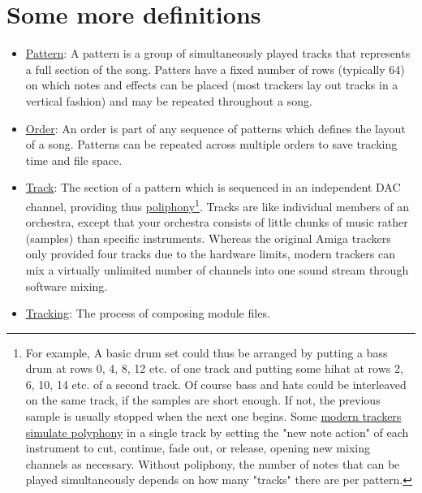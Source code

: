 \section{Some more definitions}
\begin{itemize}

\item \href{http://en.wikipedia.org/wiki/Music_tracker}{Pattern}: A
  pattern is a group of simultaneously played tracks that represents a
  full section of the song. Patters have a fixed number of rows
  (typically 64) on which notes and effects can be placed (most
  trackers lay out tracks in a vertical fashion) and may be repeated
  throughout a song.

\item \href{http://en.wikipedia.org/wiki/Music_tracker}{Order}: An
  order is part of any sequence of patterns which defines the layout of
  a song. Patterns can be repeated across multiple orders to save
  tracking time and file space.

\item
  \href{http://www.linuxplanet.com/linuxplanet/tutorials/4363/1}{Track}:
  The section of a pattern which is sequenced in an independent DAC
  channel, providing thus
  \href{http://en.wikipedia.org/wiki/Polyphony}{poliphony}\footnote{For
    example, A basic drum set could thus be arranged by putting a bass
    drum at rows 0, 4, 8, 12 etc. of one track and putting some hihat
    at rows 2, 6, 10, 14 etc. of a second track. Of course bass and
    hats could be interleaved on the same track, if the samples are
    short enough. If not, the previous sample is usually stopped when
    the next one begins. Some
    \href{http://en.wikipedia.org/wiki/Music_tracker}{modern trackers
      simulate polyphony} in a single track by setting the "new note
    action" of each instrument to cut, continue, fade out, or release,
    opening new mixing channels as necessary. Without poliphony, the
    number of notes that can be played simultaneously depends on how
    many "tracks" there are per pattern.}. Tracks are like individual
  members of an orchestra, except that your orchestra consists of
  little chunks of music rather (samples) than specific
  instruments. Whereas the original Amiga trackers only provided four
  tracks due to the hardware limits, modern trackers can mix a
  virtually unlimited number of channels into one sound stream through
  software mixing.

\item \href{http://en.wikipedia.org/wiki/Music_tracker}{Tracking}: The
  process of composing module files.


\end{itemize}
